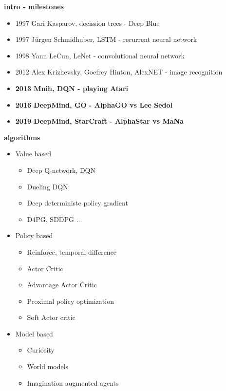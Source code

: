 \documentclass[xcolor=dvipsnames]{beamer}
\begin{document}
\begin{frame}{\bf intro - milestones}
   \begin{itemize}
      \item 1997 Gari Kasparov, decission trees - Deep Blue
      \item 1997 Jürgen Schmidhuber, LSTM - recurrent neural network
      \item 1998 Yann LeCun, LeNet - convolutional neural network
      \item 2012 Alex Krizhevsky, Goefrey Hinton, AlexNET - image recognition
      \item {\bf 2013 Mnih, DQN - playing Atari}
      \item {\bf 2016 DeepMind, GO - AlphaGO vs Lee Sedol}
      \item {\bf 2019 DeepMind, StarCraft - AlphaStar vs MaNa}
    \end{itemize}
\end{frame}

\begin{frame}{\bf algorithms}
   \begin{itemize}
    \item Value based

        \begin{itemize}
          \item Deep Q-network, DQN
          \item Dueling DQN
          \item Deep deterministc policy gradient
          \item D4PG, SDDPG ...
        \end{itemize}

    \item Policy based
    
        \begin{itemize}
          \item Reinforce, temporal difference
          \item Actor Critic
          \item Advantage Actor Critic
          \item Proximal policy optimization
          \item Soft Actor critic
        \end{itemize}

    \item Model based

        \begin{itemize}
          \item Curiosity
          \item World models
          \item Imagination augmented agents
        \end{itemize}
    
    \end{itemize}

\end{frame}
\end{document}
